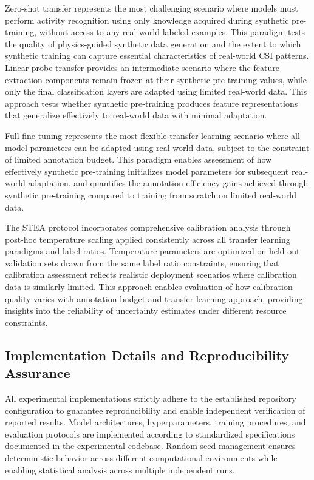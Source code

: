 \documentclass[journal]{IEEEtran}
\begin{document}
Zero-shot transfer represents the most challenging scenario where models must perform activity recognition using only knowledge acquired during synthetic pre-training, without access to any real-world labeled examples. This paradigm tests the quality of physics-guided synthetic data generation and the extent to which synthetic training can capture essential characteristics of real-world CSI patterns. Linear probe transfer provides an intermediate scenario where the feature extraction components remain frozen at their synthetic pre-training values, while only the final classification layers are adapted using limited real-world data. This approach tests whether synthetic pre-training produces feature representations that generalize effectively to real-world data with minimal adaptation.

Full fine-tuning represents the most flexible transfer learning scenario where all model parameters can be adapted using real-world data, subject to the constraint of limited annotation budget. This paradigm enables assessment of how effectively synthetic pre-training initializes model parameters for subsequent real-world adaptation, and quantifies the annotation efficiency gains achieved through synthetic pre-training compared to training from scratch on limited real-world data.

The STEA protocol incorporates comprehensive calibration analysis through post-hoc temperature scaling applied consistently across all transfer learning paradigms and label ratios. Temperature parameters are optimized on held-out validation sets drawn from the same label ratio constraints, ensuring that calibration assessment reflects realistic deployment scenarios where calibration data is similarly limited. This approach enables evaluation of how calibration quality varies with annotation budget and transfer learning approach, providing insights into the reliability of uncertainty estimates under different resource constraints.

\subsection{Implementation Details and Reproducibility Assurance}

All experimental implementations strictly adhere to the established repository configuration to guarantee reproducibility and enable independent verification of reported results. Model architectures, hyperparameters, training procedures, and evaluation protocols are implemented according to standardized specifications documented in the experimental codebase. Random seed management ensures deterministic behavior across different computational environments while enabling statistical analysis across multiple independent runs.
\end{document}
